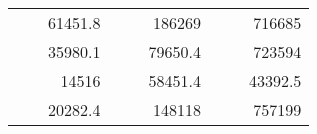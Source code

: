 \begin{table}[H]
\begin{tabular}{|ccrccrccr}
\rowcolor[HTML]{DDFDFF} 
\multicolumn{1}{|c|}{\cellcolor[HTML]{FFFFC7}}                                & \multicolumn{1}{c|}{\cellcolor[HTML]{DDFDFF}}                      & \multicolumn{1}{r|}{\cellcolor[HTML]{DAE8FC}61451.8}   & \multicolumn{1}{c|}{\cellcolor[HTML]{FFFFC7}}                                & \multicolumn{1}{c|}{\cellcolor[HTML]{DDFDFF}}                       & \multicolumn{1}{r|}{\cellcolor[HTML]{DDFDFF}186269}    & \multicolumn{1}{c|}{\cellcolor[HTML]{FFFFC7}}                                & \multicolumn{1}{c|}{\cellcolor[HTML]{DDFDFF}}                      & \multicolumn{1}{r|}{\cellcolor[HTML]{DDFDFF}716685}    \\ \cline{3-3} \cline{6-6} \cline{9-9} 
\multicolumn{1}{|c|}{\cellcolor[HTML]{FFFFC7}}                                & \multicolumn{1}{c|}{\cellcolor[HTML]{DDFDFF}}                      & \multicolumn{1}{r|}{\cellcolor[HTML]{DDFDFF}35980.1}   & \multicolumn{1}{c|}{\cellcolor[HTML]{FFFFC7}}                                & \multicolumn{1}{c|}{\cellcolor[HTML]{DDFDFF}}                       & \multicolumn{1}{r|}{\cellcolor[HTML]{DAE8FC}79650.4}   & \multicolumn{1}{c|}{\cellcolor[HTML]{FFFFC7}}                                & \multicolumn{1}{c|}{\cellcolor[HTML]{DDFDFF}}                      & \multicolumn{1}{r|}{\cellcolor[HTML]{DAE8FC}723594}    \\ \cline{3-3} \cline{6-6} \cline{9-9} 
\rowcolor[HTML]{DDFDFF} 
\multicolumn{1}{|c|}{\cellcolor[HTML]{FFFFC7}}                                & \multicolumn{1}{c|}{\cellcolor[HTML]{DDFDFF}}                      & \multicolumn{1}{r|}{\cellcolor[HTML]{DAE8FC}14516}     & \multicolumn{1}{c|}{\cellcolor[HTML]{FFFFC7}}                                & \multicolumn{1}{c|}{\cellcolor[HTML]{DDFDFF}}                       & \multicolumn{1}{r|}{\cellcolor[HTML]{DDFDFF}58451.4}   & \multicolumn{1}{c|}{\cellcolor[HTML]{FFFFC7}}                                & \multicolumn{1}{c|}{\cellcolor[HTML]{DDFDFF}}                      & \multicolumn{1}{r|}{\cellcolor[HTML]{DDFDFF}43392.5}   \\ \cline{3-3} \cline{6-6} \cline{9-9} 
\multicolumn{1}{|c|}{\cellcolor[HTML]{FFFFC7}}                                & \multicolumn{1}{c|}{\cellcolor[HTML]{DDFDFF}}                      & \multicolumn{1}{r|}{\cellcolor[HTML]{DDFDFF}20282.4}   & \multicolumn{1}{c|}{\cellcolor[HTML]{FFFFC7}}                                & \multicolumn{1}{c|}{\cellcolor[HTML]{DDFDFF}}                       & \multicolumn{1}{r|}{\cellcolor[HTML]{DAE8FC}148118}    & \multicolumn{1}{c|}{\cellcolor[HTML]{FFFFC7}}                                & \multicolumn{1}{c|}{\cellcolor[HTML]{DDFDFF}}                      & \multicolumn{1}{r|}{\cellcolor[HTML]{DAE8FC}757199}    \\ \cline{3-3} \cline{6-6} \cline{9-9} 

\end{tabular}
\end{table}
